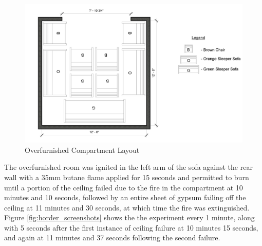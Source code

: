 \documentclass{article}
\begin{document}
\begin{figure}[H]
	\centering
	\includegraphics[width=5in]{0_Images/Vent_Limited_Room/HorderRoom.jpg}
	\caption{Overfurnished Compartment Layout}
	\label{fig:horder_layout}
\end{figure}

The overfurnished room was ignited in the left arm of the sofa against the rear wall with a 35mm butane flame applied for 15 seconds and permitted to burn until a portion of the ceiling failed due to the fire in the compartment at 10 minutes and 10 seconds, followed by an entire sheet of gypsum failing off the ceiling at 11 minutes and 30 seconds, at which time the fire was extinguished. Figure \ref{fig:horder_screenshots} shows the the experiment every 1 minute, along with 5 seconds after the first instance of ceiling failure at 10 minutes 15 seconds, and again at 11 minutes and 37 seconds following the second failure.
\end{document}
